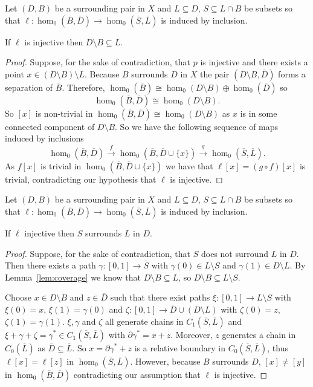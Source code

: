 \begin{lemma}\label{lem:coverage}
  Let $(D, B)$ be a surrounding pair in $X$ and $L\subseteq D$, $S\subseteq L\cap B$ be subsets so that $\ell: \hom_0(\overline{B}, \overline{D})\to \hom_0(\overline{S}, \overline{L})$ is induced by inclusion.

  If $\ell$ is injective then $D\setminus B\subseteq L$.
\end{lemma}
\begin{proof}
    Suppose, for the sake of contradiction, that $p$ is injective and there exists a point $x\in (D\setminus B)\setminus L$.
    Because $B$ surrounds $D$ in $X$ the pair $(D\setminus B, \overline{D})$ forms a separation of $\overline{B}$.
    Therefore, $\hom_0(\overline{B})\cong \hom_0(D\setminus B)\oplus \hom_0(\overline{D})$ so
    \[ \hom_0(\overline{B}, \overline{D})\cong \hom_0(D\setminus B). \]
    So $[x]$ is non-trivial in $\hom_0(\overline{B},\overline{D})\cong \hom_0(D\setminus B)$ as $x$ is in some connected component of $D\setminus B$.
    So we have the following sequence of maps induced by inclusions
    \[ \hom_0(\overline{B},\overline{D})\xrightarrow{f} \hom_0(\overline{B},\overline{D}\cup\{x\})\xrightarrow{g} \hom_0(\overline{S},\overline{L}).\]
    As $f[x]$ is trivial in $\hom_0(\overline{B},\overline{D}\cup\{x\})$ we have that $\ell[x] = (g\circ f)[x]$ is trivial, contradicting our hypothesis that $\ell$ is injective.
\end{proof}

\begin{lemma}\label{lem:cov_surrounds}
  Let $(D, B)$ be a surrounding pair in $X$ and $L\subseteq D$, $S\subseteq L\cap B$ be subsets so that $\ell: \hom_0(\overline{B}, \overline{D})\to \hom_0(\overline{S}, \overline{L})$ is induced by inclusion.

  If $\ell$ injective then $S$ surrounds $L$ in $D$.
\end{lemma}
\begin{proof}
  Suppose, for the sake of contradiction, that $S$ does not surround $L$ in $D$.
  Then there exists a path $\gamma : [0,1]\to\overline{S}$ with $\gamma(0)\in L\setminus S$ and $\gamma(1)\in D\setminus L$.
  By Lemma~\ref{lem:coverage} we know that $D\setminus B\subseteq L$, so $D\setminus B\subseteq L\setminus S$.

  Choose $x\in D\setminus B$ and $z\in \overline{D}$ such that there exist paths $\xi : [0,1]\to L\setminus S$ with $\xi(0) = x$, $\xi(1) = \gamma(0)$ and $\zeta : [0,1]\to \overline{D}\cup (D\setminus L)$ with $\zeta(0) = z$, $\zeta(1) = \gamma(1)$.
  $\xi, \gamma$ and $\zeta$ all generate chains in $C_1(\overline{S}, \overline{L})$ and $\xi + \gamma + \zeta = \gamma^*\in C_1(\overline{S}, \overline{L})$ with $\partial\gamma^* = x + z$.
  Moreover, $z$ generates a chain in $C_0(\overline{L})$ as $\overline{D}\subseteq\overline{L}$.
  So $x = \partial\gamma^* + z$ is a relative boundary in $C_0(\overline{S}, \overline{L})$, thus $\ell[x] = \ell[z]$ in $\hom_0(\overline{S}, \overline{L})$.
  However, because $B$ surrounds $D$, $[x]\neq [y]$ in $\hom_0(\overline{B}, \overline{D})$ contradicting our assumption that $\ell$ is injective.
\end{proof}
